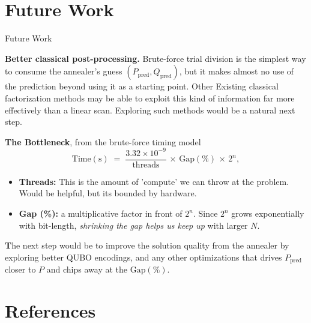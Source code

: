 \documentclass[9pt]{beamer}
\begin{document}
\section{Future Work}

\begin{frame}{Future Work}

\textbf{Better classical post-processing.} Brute-force trial division is the simplest way to consume the annealer's guess $(P_{\text{pred}}, Q_{\text{pred}})$, but it makes almost no use of the prediction beyond using it as a starting point. Other Existing classical factorization methods may be able to exploit this kind of information far more effectively than a linear scan. Exploring such methods would be a natural next step.

\medskip
\textbf{The Bottleneck}, from the brute-force timing model
\[
\text{Time}(\text{s}) \;=\; \frac{3.32 \times 10^{-9}}{\text{threads}} \,\times\, \text{Gap}(\%) \,\times\, 2^n,
\]

\begin{itemize}
  \item \textbf{Threads:} This is the amount of 'compute' we can throw at the problem. Would be helpful, but its bounded by hardware.
  \item \textbf{Gap (\%):} a multiplicative factor in front of $2^n$. Since $2^n$ grows exponentially with bit-length, \emph{shrinking the gap helps us keep up} with larger $N$.
\end{itemize}

\medskip
\textbf The next step would be to improve the solution quality from the annealer by exploring better QUBO encodings, and any other optimizations that drives $P_{\text{pred}}$ closer to $P$ and chips away at the $\text{Gap}(\%)$.

\end{frame}

\section{References}
\end{document}
